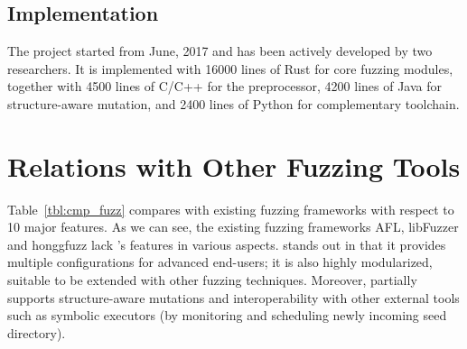 %
%
%
 

\subsection{Implementation}\label{sec:fot-impl}

The {\FOT} project started from June, 2017 and has been actively developed by two researchers. It is implemented with 16000 lines of Rust for core fuzzing modules, together with 4500 lines of C/C++ for the preprocessor, 4200 lines of Java for structure-aware mutation, and 2400 lines of Python for complementary toolchain.
  

\section{Relations with Other Fuzzing Tools}





Table~\ref{tbl:cmp_fuzz} compares {\FOT} with existing fuzzing frameworks with respect to 10 major features. As we can see, the existing fuzzing frameworks AFL, libFuzzer and honggfuzz lack \FOT's features in various aspects. {\FOT} stands out in that it provides multiple configurations for advanced end-users; it is also highly modularized, suitable to be extended with other fuzzing techniques. Moreover, {\FOT} partially supports structure-aware mutations and interoperability with other external tools such as symbolic executors (by monitoring and scheduling newly incoming seed directory).

